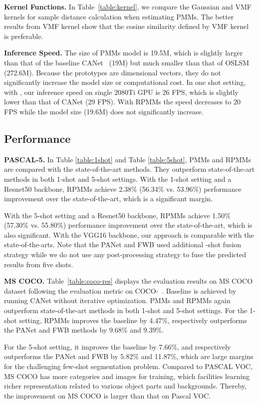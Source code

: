 \documentclass[runningheads]{llncs}
\begin{document}
\textbf{Kernel Functions.} In Table~\ref{table:kernel}, we compare the Gaussian and VMF kernels for sample distance calculation when estimating PMMs. The better results from VMF kernel show that the cosine similarity defined by VMF kernel is preferable.

\textbf{Inference Speed.} The size of PMMs model is 19.5M, which is slightly larger than that of the baseline CANet~\cite{CaNet} (19M) but much smaller than that of OSLSM~\cite{OSLSM} (272.6M). Because the prototypes are  dimensional vectors, they do not significantly increase the model size or computational cost. In one shot setting, with , our inference speed on single 2080Ti GPU is 26 FPS, which is slightly lower than that of CANet (29 FPS). With RPMMs the speed decreases to 20 FPS while the model size (19.6M) does not significantly increase.


\subsection{Performance}
\textbf{PASCAL-5.} 
In Table \ref{table:1shot} and Table \ref{table:5shot}, PMMs and RPMMs are compared with the state-of-the-art methods. They outperform state-of-the-art methods in both 1-shot and 5-shot settings. With the 1-shot setting and a Resnet50 backbone, RPMMs achieve 2.38\% (56.34\% vs. 53.96\%) performance improvement over the state-of-the-art, which is a significant margin. 

With the 5-shot setting and a Resnet50 backbone, RPMMs achieve 1.50\% (57.30\% vs. 55.80\%) performance improvement over the state-of-the-art, which is also significant. With the VGG16 backbone, our approach is comparable with the state-of-the-arts. Note that the PANet and FWB used additional -shot fusion strategy while we do not use any post-processing strategy to fuse the predicted results from five shots.


\textbf{MS COCO.} Table~\ref{table:coco-res} displays the evaluation results on MS COCO dataset following the evaluation metric on COCO-~\cite{FWB-ICCV2019}. Baseline is achieved by running CANet without iterative optimization. PMMs and RPMMs again outperform state-of-the-art methods in both 1-shot and 5-shot settings. 
For the 1-shot setting, RPMMs improves the baseline by 4.47\%, respectively outperforms the PANet and FWB methods by 9.68\% and 9.39\%. 

For the 5-shot setting, it improves the baseline by 7.66\%, and respectively outperforms the PANet and FWB by 5.82\% and 11.87\%, which are large margins for the challenging few-shot segmentation problem. Compared to PASCAL VOC, MS COCO has more categories and images for training, which facilities learning richer representation related to various object parts and backgrounds. Thereby, the improvement on MS COCO is larger than that on Pascal VOC.
\end{document}
